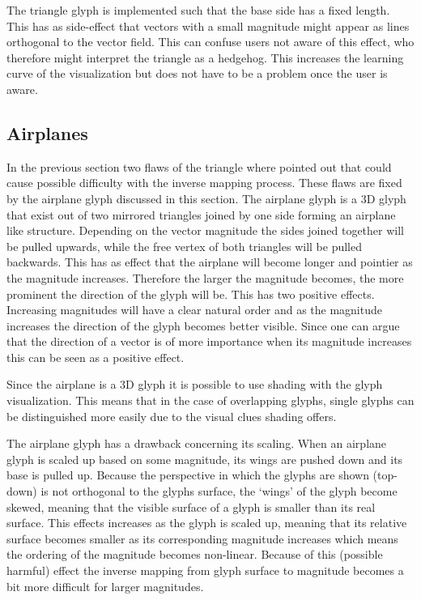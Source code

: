 The triangle glyph is implemented such that the base side has a fixed length. This has as side-effect that vectors with a small magnitude might appear as lines orthogonal to the vector field. This can confuse users not aware of this effect, who therefore might interpret the triangle as a hedgehog. This increases the learning curve of the visualization but does not have to be a problem once the user is aware.

\subsection{Airplanes} %
\label{sub:airplanes}
In the previous section two flaws of the triangle where pointed out that could cause possible difficulty with the inverse mapping process. These flaws are fixed by the airplane glyph discussed in this section. The airplane glyph is a 3D glyph that exist out of two mirrored triangles joined by one side forming an airplane like structure. Depending on the vector magnitude the sides joined together will be pulled upwards, while the free vertex of both triangles will be pulled backwards. This has as effect that the airplane will become longer and pointier as the magnitude increases. Therefore the larger the magnitude becomes, the more prominent the direction of the glyph will be. This has two positive effects. Increasing magnitudes will have a clear natural order and as the magnitude increases the direction of the glyph becomes better visible. Since one can argue that the direction of a vector is of more importance when its magnitude increases this can be seen as a positive effect.

Since the airplane is a 3D glyph it is possible to use shading with the glyph visualization. This means that in the case of overlapping glyphs, single glyphs can be distinguished more easily due to the visual clues shading offers. 

The airplane glyph has a drawback concerning its scaling. When an airplane glyph is scaled up based on some magnitude, its wings are pushed down and its base is pulled up. Because the perspective in which the glyphs are shown (top-down) is not orthogonal to the glyphs surface, the `wings' of the glyph become skewed, meaning that the visible surface of a glyph is smaller than its real surface. This effects increases as the glyph is scaled up, meaning that its relative surface becomes smaller as its corresponding magnitude increases which means the ordering of the magnitude becomes non-linear. Because of this (possible harmful) effect the inverse mapping from glyph surface to magnitude becomes a bit more difficult for larger magnitudes.



